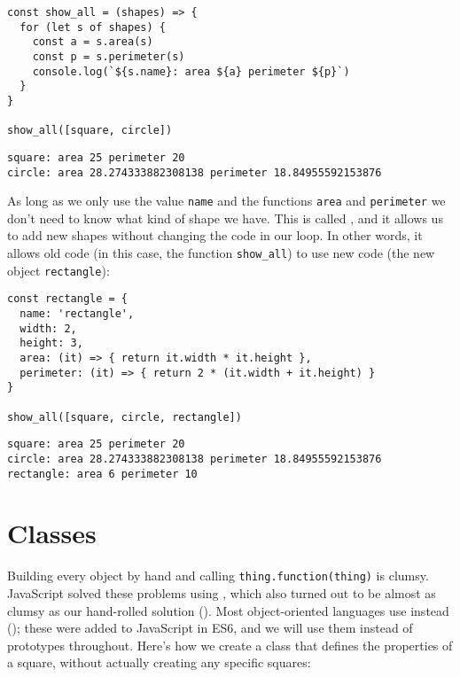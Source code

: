 \begin{verbatim}
const show_all = (shapes) => {
  for (let s of shapes) {
    const a = s.area(s)
    const p = s.perimeter(s)
    console.log(`${s.name}: area ${a} perimeter ${p}`)
  }
}

show_all([square, circle])
\end{verbatim}

\begin{verbatim}
square: area 25 perimeter 20
circle: area 28.274333882308138 perimeter 18.84955592153876
\end{verbatim}

As long as we only use the value \texttt{name} and the functions \texttt{area} and \texttt{perimeter}
we don't need to know what kind of shape we have.
This is called ,
and it allows us to add new shapes without changing the code in our loop.
In other words,
it allows old code (in this case, the function \texttt{show\_all})
to use new code (the new object \texttt{rectangle}):

\begin{verbatim}
const rectangle = {
  name: 'rectangle',
  width: 2,
  height: 3,
  area: (it) => { return it.width * it.height },
  perimeter: (it) => { return 2 * (it.width + it.height) }
}

show_all([square, circle, rectangle])
\end{verbatim}

\begin{verbatim}
square: area 25 perimeter 20
circle: area 28.274333882308138 perimeter 18.84955592153876
rectangle: area 6 perimeter 10
\end{verbatim}

\section{Classes}\label{s:oop-classes}

Building every object by hand and calling \texttt{thing.function(thing)} is clumsy.
JavaScript solved these problems using ,
which also turned out to be almost as clumsy as our hand-rolled solution ().
Most object-oriented languages use  instead ();
these were added to JavaScript in ES6,
and we will use them instead of prototypes throughout.
Here's how we create a class that defines the properties of a square,
without actually creating any specific squares:

